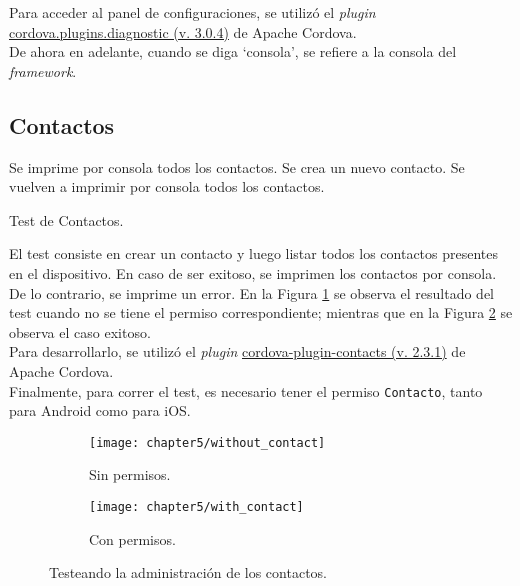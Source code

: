 Para acceder al panel de configuraciones, se utilizó el \textit{plugin} \href{https://www.npmjs.com/package/cordova.plugins.diagnostic}{cordova.plugins.diagnostic (v. 3.0.4)} de Apache Cordova.\\

De ahora en adelante, cuando se diga `consola', se refiere a la consola del \textit{framework}.
\subsection{Contactos}
\begin{algorithm}
	\begin{algorithmic}[1]
		\STATE Se imprime por consola todos los contactos.
		\STATE Se crea un nuevo contacto.
		\STATE Se vuelven a imprimir por consola todos los contactos.
	\end{algorithmic}
	\caption{Test de Contactos.}\label{alg:chap5:test_contactos}
\end{algorithm}
El test consiste en crear un contacto y luego listar todos los contactos presentes en el dispositivo. En caso de ser exitoso, se imprimen los contactos por consola. De lo contrario, se imprime un error. En la Figura \ref{fig:ch05:without_contact} se observa el resultado del test cuando no se tiene el permiso correspondiente; mientras que en la Figura \ref{fig:ch05:with_contact} se observa el caso exitoso.\\

Para desarrollarlo, se utilizó el \textit{plugin} \href{https://www.npmjs.com/package/cordova-plugin-contacts}{cordova-plugin-contacts (v. 2.3.1)} de Apache Cordova.\\

Finalmente, para correr el test, es necesario tener el permiso \texttt{Contacto}, tanto para Android como para iOS.
\begin{figure}[htbp]
    \centering
    \begin{subfigure}{0.3\linewidth}
        \texttt{[image: chapter5/without\_contact]}
        \caption{Sin permisos.}
        \label{fig:ch05:without_contact}
    \end{subfigure}
    \begin{subfigure}{0.3\linewidth}
        \texttt{[image: chapter5/with\_contact]}
        \caption{Con permisos.}
        \label{fig:ch05:with_contact}
    \end{subfigure}
    \caption{Testeando la administración de los contactos.}
	\label{fig:ch05:contacts-cases}
\end{figure}
